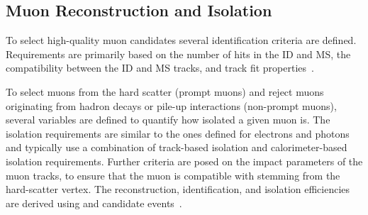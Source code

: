 \subsection{Muon Reconstruction and Isolation}
To select high-quality muon candidates several identification criteria are defined.
Requirements are primarily based on the number of hits in the ID and MS, the compatibility between the ID and MS tracks, and track fit properties~\cite{MUON-2018-03}.

To select muons from the hard scatter (prompt muons) and reject muons originating from hadron decays or pile-up interactions (non-prompt muons), several variables are defined to quantify how isolated a given muon is.
The isolation requirements are similar to the ones defined for electrons and photons and typically use a combination of track-based isolation and calorimeter-based isolation requirements.
Further criteria are posed on the impact parameters of the muon tracks, to ensure that the muon is compatible with stemming from the hard-scatter vertex.
The reconstruction, identification, and isolation efficiencies are derived using \Jpsimumu and \Zmumu candidate events~\cite{MUON-2018-03}.





